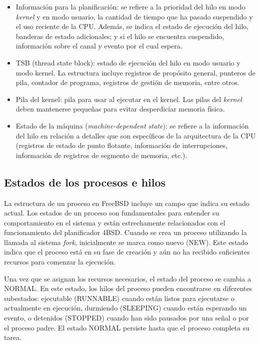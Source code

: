\begin{itemize}
    \item Información para la planificación: se refiere a la prioridad del hilo en modo \textit{kernel} y en modo usuario, la cantidad de tiempo que ha pasado suspendido y el uso reciente de la CPU. Además, se indica el estado de ejecución del hilo, banderas de estado adicionales; y si el hilo se encuentra suspendido, información sobre el canal y evento por el cual espera.
    \item TSB (thread state block): estado de ejecución del hilo en modo usuario y modo kernel. La estructura incluye registros de propósito general, punteros de pila, contador de programa, registros de gestión de memoria, entre otros.
    \item Pila del kernel: pila para usar al ejecutar en el kernel. Las pilas del \textit{kernel} deben mantenerse pequeñas para evitar desperdiciar memoria física.
    \item Estado de la máquina (\textit{machine-dependent state}): se refiere a la información del hilo en relación a detalles que son específicos de la arquitectura de la CPU (registros de estado de punto flotante, información de interrupciones, información de registros de segmento de memoria, etc.).
\end{itemize}

\subsection{Estados de los procesos e hilos}

La estructura de un proceso en FreeBSD incluye un campo que indica su estado actual. Los estados de un proceso son fundamentales para entender su comportamiento en el sistema y están estrechamente relacionados con el funcionamiento del planificador 4BSD. Cuando se crea un proceso utilizando la llamada al sistema \textit{fork}, inicialmente se marca como nuevo (NEW). Este estado indica que el proceso está en su fase de creación y aún no ha recibido suficientes recursos para comenzar la ejecución.

Una vez que se asignan los recursos necesarios, el estado del proceso se cambia a NORMAL. En este estado, los hilos del proceso pueden encontrarse en diferentes subestados: ejecutable (RUNNABLE) cuando están listos para ejecutarse o actualmente en ejecución, durmiendo (SLEEPING) cuando están esperando un evento, o detenidos (STOPPED) cuando han sido pausados por una señal o por el proceso padre. El estado NORMAL persiste hasta que el proceso completa su tarea.

